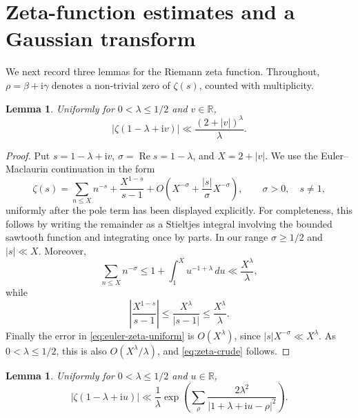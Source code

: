\documentclass[12pt,reqno]{amsart}
\newtheorem{lemma}[theorem]{Lemma}
\theoremstyle{remark}
\numberwithin{equation}{section}
\newcommand{\R}{\mathbb R}
\newcommand{\Ree}{\operatorname{Re}}
\newcommand{\ii}{\mathrm i}
\begin{document}
\section{Zeta-function estimates and a Gaussian transform}\label{sec:zeta-tools}

We next record three lemmas for the Riemann zeta function.  Throughout, $\rho=\beta+\ii\gamma$ denotes a non-trivial zero of $\zeta(s)$, counted with multiplicity.

\begin{lemma}\label{lem:zeta-crude}
Uniformly for $0<\lambda\le1/2$ and $v\in\R$,
\begin{equation}\label{eq:zeta-crude}
|\zeta(1-\lambda+\ii v)|
\ll \frac{(2+|v|)^\lambda}{\lambda}.
\end{equation}
\end{lemma}

\begin{proof}
Put $s=1-\lambda+\ii v$, $\sigma=\Ree s=1-\lambda$, and $X=2+|v|$.  We use the Euler--Maclaurin continuation in the form
\begin{equation}\label{eq:euler-zeta-uniform}
\zeta(s)
=\sum_{n\le X}n^{-s}+\frac{X^{1-s}}{s-1}
+O\!\left(X^{-\sigma}+\frac{|s|}{\sigma}X^{-\sigma}\right),
\qquad \sigma>0,\quad s\ne1,
\end{equation}
uniformly after the pole term has been displayed explicitly.  For completeness, this follows by writing the remainder as a Stieltjes integral involving the bounded sawtooth function and integrating once by parts.  In our range $\sigma\ge1/2$ and $|s|\ll X$.  Moreover,
\[
\sum_{n\le X}n^{-\sigma}
\le 1+\int_1^X u^{-1+\lambda}\,du
\ll \frac{X^\lambda}{\lambda},
\]
while
\[
\left|\frac{X^{1-s}}{s-1}\right|
\le \frac{X^\lambda}{|s-1|}
\le \frac{X^\lambda}{\lambda}.
\]
Finally the error in \eqref{eq:euler-zeta-uniform} is $O(X^\lambda)$, since $|s|X^{-\sigma}\ll X^\lambda$.  As $0<\lambda\le1/2$, this is also $O(X^\lambda/\lambda)$, and \eqref{eq:zeta-crude} follows.
\end{proof}

\begin{lemma}\label{lem:zero-bound}
Uniformly for $0<\lambda\le1/2$ and $u\in\R$,
\begin{equation}\label{eq:zero-bound}
|\zeta(1-\lambda+\ii u)|
\ll \frac1\lambda
\exp\!\left(
\sum_\rho\frac{2\lambda^2}{|1+\lambda+\ii u-\rho|^2}
\right).
\end{equation}
\end{lemma}
\end{document}
